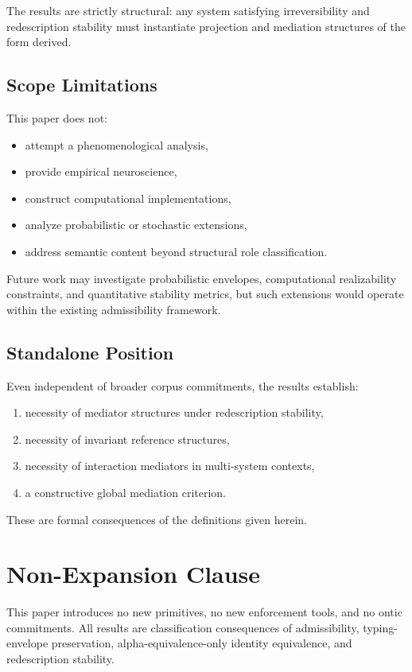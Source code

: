 \documentclass[11pt]{article}
\theoremstyle{definition}
\begin{document}
The results are strictly structural: any system satisfying
irreversibility and redescription stability must instantiate
projection and mediation structures of the form derived.

\subsection{Scope Limitations}

This paper does not:

\begin{itemize}
    \item attempt a phenomenological analysis,
    \item provide empirical neuroscience,
    \item construct computational implementations,
    \item analyze probabilistic or stochastic extensions,
    \item address semantic content beyond structural role classification.
\end{itemize}

Future work may investigate probabilistic envelopes,
computational realizability constraints,
and quantitative stability metrics,
but such extensions would operate within the existing admissibility framework.

\subsection{Standalone Position}

Even independent of broader corpus commitments,
the results establish:

\begin{enumerate}[label=(\roman*)]
    \item necessity of mediator structures under redescription stability,
    \item necessity of invariant reference structures,
    \item necessity of interaction mediators in multi-system contexts,
    \item a constructive global mediation criterion.
\end{enumerate}

These are formal consequences of the definitions given herein.


\section*{Non-Expansion Clause}
This paper introduces no new primitives, no new enforcement tools, and no ontic commitments. All results are classification consequences of admissibility, typing-envelope preservation, alpha-equivalence-only identity equivalence, and redescription stability.
\end{document}

